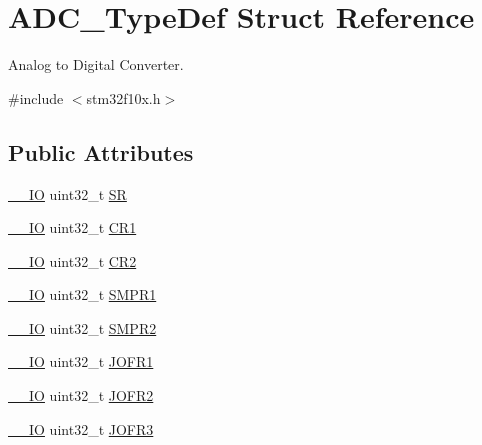 \hypertarget{struct_a_d_c___type_def}{}\section{A\+D\+C\+\_\+\+Type\+Def Struct Reference}
\label{struct_a_d_c___type_def}


Analog to Digital Converter.  




{\ttfamily \#include $<$stm32f10x.\+h$>$}

\subsection*{Public Attributes}
\begin{DoxyCompactItemize}
\item 
\hyperlink{core__sc300_8h_aec43007d9998a0a0e01faede4133d6be}{\+\_\+\+\_\+\+IO} uint32\+\_\+t \hyperlink{struct_a_d_c___type_def_a9745df96e98f3cdc2d05ccefce681f64}{SR}
\item 
\hyperlink{core__sc300_8h_aec43007d9998a0a0e01faede4133d6be}{\+\_\+\+\_\+\+IO} uint32\+\_\+t \hyperlink{struct_a_d_c___type_def_a89b1ff4376683dd2896ea8b32ded05b2}{C\+R1}
\item 
\hyperlink{core__sc300_8h_aec43007d9998a0a0e01faede4133d6be}{\+\_\+\+\_\+\+IO} uint32\+\_\+t \hyperlink{struct_a_d_c___type_def_a1053a65a21af0d27afe1bf9cf7b7aca7}{C\+R2}
\item 
\hyperlink{core__sc300_8h_aec43007d9998a0a0e01faede4133d6be}{\+\_\+\+\_\+\+IO} uint32\+\_\+t \hyperlink{struct_a_d_c___type_def_a73009a8122fcc628f467a4e997109347}{S\+M\+P\+R1}
\item 
\hyperlink{core__sc300_8h_aec43007d9998a0a0e01faede4133d6be}{\+\_\+\+\_\+\+IO} uint32\+\_\+t \hyperlink{struct_a_d_c___type_def_a9e68fe36c4c8fbbac294b5496ccf7130}{S\+M\+P\+R2}
\item 
\hyperlink{core__sc300_8h_aec43007d9998a0a0e01faede4133d6be}{\+\_\+\+\_\+\+IO} uint32\+\_\+t \hyperlink{struct_a_d_c___type_def_aa005e656f528aaad28d70d61c9db9b81}{J\+O\+F\+R1}
\item 
\hyperlink{core__sc300_8h_aec43007d9998a0a0e01faede4133d6be}{\+\_\+\+\_\+\+IO} uint32\+\_\+t \hyperlink{struct_a_d_c___type_def_aa20f76044c11042dde41c1060853fb82}{J\+O\+F\+R2}
\item 
\hyperlink{core__sc300_8h_aec43007d9998a0a0e01faede4133d6be}{\+\_\+\+\_\+\+IO} uint32\+\_\+t \hyperlink{struct_a_d_c___type_def_ae9c78142f6edf8122384263878d09015}{J\+O\+F\+R3}

\end{DoxyCompactItemize}
